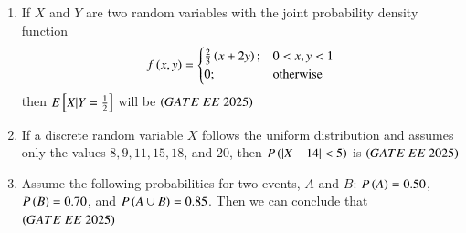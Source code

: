 \documentclass[journal,12pt,onecolumn]{IEEEtran}
\theoremstyle{remark}
\begin{document}
\begin{enumerate}
\item If $X$ and $Y$ are two random variables with the joint probability density function \\
\begin{align}
f \left(x, y\right) =
\begin{cases}
\frac{2}{3} \left(x + 2y\right); & 0 < x, y < 1 \\
0; & \text{otherwise}
\end{cases}
\end{align}
then $E{}\left[X|Y=\frac{1}{2}\right]$ will be
\hfill $\brak{GATE\ EE\ 2025}$
\begin{enumerate}
\end{enumerate}
 
\item If a discrete random variable $X$ follows the uniform distribution and assumes only the values $8, 9, 11, 15, 18$, and $20$, then $P \left(|X - 14| < 5\right)$ is
\hfill $\brak{GATE\ EE\ 2025}$
\begin{enumerate}
\end{enumerate}
 
\item Assume the following probabilities for two events, $A$ and $B$: $P \left(A\right) = 0.50$, $P \left(B\right) = 0.70$, and $P \left(A \cup B\right) = 0.85$. Then we can conclude that
\hfill $\brak{GATE\ EE\ 2025}$
\begin{enumerate}
\end{enumerate}
 

\end{enumerate}
\end{document}
